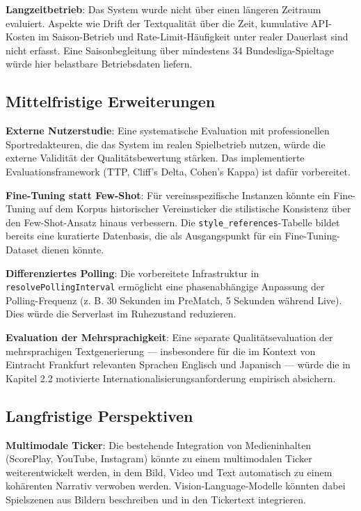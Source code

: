 \textbf{Langzeitbetrieb}: Das System wurde nicht über einen längeren
Zeitraum evaluiert. Aspekte wie Drift der Textqualität über die Zeit,
kumulative API-Kosten im Saison-Betrieb und Rate-Limit-Häufigkeit unter
realer Dauerlast sind nicht erfasst. Eine Saisonbegleitung über
mindestens 34 Bundesliga-Spieltage würde hier belastbare Betriebsdaten
liefern.

\subsection{Mittelfristige
Erweiterungen}\label{mittelfristige-erweiterungen}

\textbf{Externe Nutzerstudie}: Eine systematische Evaluation mit
professionellen Sportredakteuren, die das System im realen Spielbetrieb
nutzen, würde die externe Validität der Qualitätsbewertung stärken. Das
implementierte Evaluationsframework (TTP, Cliff's Delta, Cohen's Kappa)
ist dafür vorbereitet.

\textbf{Fine-Tuning statt Few-Shot}: Für vereinsspezifische Instanzen
könnte ein Fine-Tuning auf dem Korpus historischer Vereinsticker die
stilistische Konsistenz über den Few-Shot-Ansatz hinaus verbessern. Die
\texttt{style\_references}-Tabelle bildet bereits eine kuratierte
Datenbasis, die als Ausgangspunkt für ein Fine-Tuning-Dataset dienen
könnte.

\textbf{Differenziertes Polling}: Die vorbereitete Infrastruktur in
\texttt{resolvePollingInterval} ermöglicht eine phasenabhängige
Anpassung der Polling-Frequenz (z. B. 30 Sekunden im PreMatch, 5
Sekunden während Live). Dies würde die Serverlast im Ruhezustand
reduzieren.

\textbf{Evaluation der Mehrsprachigkeit}: Eine separate
Qualitätsevaluation der mehrsprachigen Textgenerierung --- insbesondere
für die im Kontext von Eintracht Frankfurt relevanten Sprachen Englisch
und Japanisch --- würde die in Kapitel 2.2 motivierte
Internationalisierungsanforderung empirisch absichern.

\subsection{Langfristige
Perspektiven}\label{langfristige-perspektiven}

\textbf{Multimodale Ticker}: Die bestehende Integration von
Medieninhalten (ScorePlay, YouTube, Instagram) könnte zu einem
multimodalen Ticker weiterentwickelt werden, in dem Bild, Video und Text
automatisch zu einem kohärenten Narrativ verwoben werden.
Vision-Language-Modelle könnten dabei Spielszenen aus Bildern
beschreiben und in den Tickertext integrieren.

